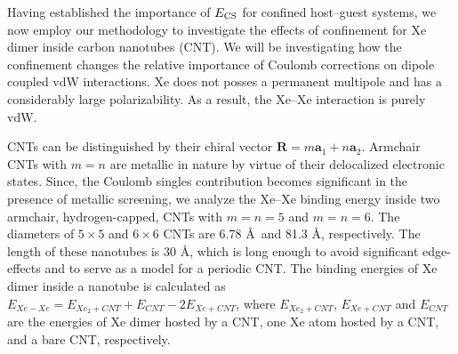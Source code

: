 \documentclass[aps,prl,groupaddress, twocolumn]{revtex4-1}  %
\begin{document}
Having established the importance of $E_{\rm CS}$ for confined host--guest systems, we now employ our methodology to investigate the effects of confinement for Xe dimer inside carbon nanotubes (CNT). We will be investigating how the confinement changes the relative importance of Coulomb corrections on dipole coupled vdW interactions. Xe does not posses a permanent multipole and has a considerably large polarizability. As a result, the Xe--Xe interaction is purely vdW.

CNTs can be distinguished by their chiral vector $\mathbf{R}=m \mathbf{a}_1 +n \mathbf{a}_2 $.
Armchair CNTs with $m=n$ are metallic in nature by virtue of their delocalized electronic states. Since, the Coulomb singles contribution becomes significant in the presence of metallic screening\cite{sadhukhan_prl_2017}, we analyze the Xe--Xe binding energy inside two armchair, hydrogen-capped, CNTs with $m = n = 5$ and $m = n = 6$. The diameters of $5\times5$ and $6\times6$ CNTs are 6.78 \AA\ and 81.3 \AA, respectively. The length of these nanotubes is 30 \AA, which is long enough to avoid significant edge-effects and to serve as a model for a periodic CNT\@. The binding energies of Xe dimer inside a nanotube is calculated as $E_{Xe-Xe} = E_{Xe_2+CNT}+E_{CNT} - 2 E_{Xe+CNT}$, where $E_{Xe_2+CNT}$, $E_{Xe+CNT}$ and $E_{CNT}$ are the energies of Xe dimer hosted by a CNT, one Xe atom hosted by a CNT, and a bare CNT, respectively.
\end{document}
